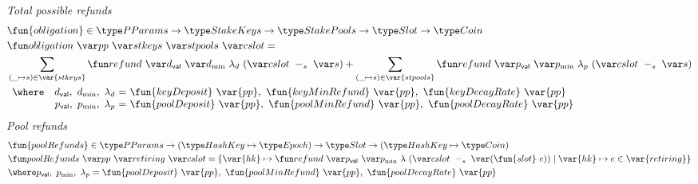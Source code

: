 \begin{figure}[htb]
  \emph{Total possible refunds}
  \begin{align*}
      & \fun{obligation} \in \PParams \to \StakeKeys \to \StakePools \to \Slot \to \Coin \\
      & \obligation{pp}{stkeys}{stpools}{cslot} =\\
      & \sum\limits_{(\_ \mapsto s) \in \var{stkeys}}
        \refund{d_{\mathsf{val}}}{d_{\min}}{\lambda_d}{(\slotminus{cslot}{s})}
        + \sum\limits_{(\_ \mapsto s) \in \var{stpools}}
        \refund{p_{\mathsf{val}}}{p_{\min}}{\lambda_p}{(\slotminus{cslot}{s})} \\
      &
      \begin{array}{lr@{~=~}l}
        \where
          & \dval,~d_{\min},~\lambda_d
          & \fun{keyDeposit}~\var{pp},~\fun{keyMinRefund}~\var{pp},~\fun{keyDecayRate}~\var{pp}
          \\
          & p_{\mathsf{val}},~p_{\min},~\lambda_p
          & \fun{poolDeposit}~\var{pp},~\fun{poolMinRefund}~\var{pp},~\fun{poolDecayRate}~\var{pp}
      \end{array}\\
  \end{align*}
  \emph{Pool refunds}
  \begin{align*}
      & \fun{poolRefunds} \in \PParams \to (\HashKey \mapsto \Epoch) \to \Slot \to 
        (\HashKey \mapsto \Coin) \\
      & \poolRefunds{pp}{retiring}{cslot} = \left\{
        \var{hk}\mapsto
          \refund{p_{\mathsf{val}}}{p_{\min}}{\lambda}{(\slotminus{cslot}{(\fun{slot}~e)})}
          \mid
          \var{hk}\mapsto e\in\var{retiring}
        \right\}\\
      & \where p_{\mathsf{val}},~p_{\min},~\lambda_p =
          \fun{poolDeposit}~\var{pp},~\fun{poolMinRefund}~\var{pp},~\fun{poolDecayRate}~\var{pp} \\
  \end{align*}


\end{figure}

